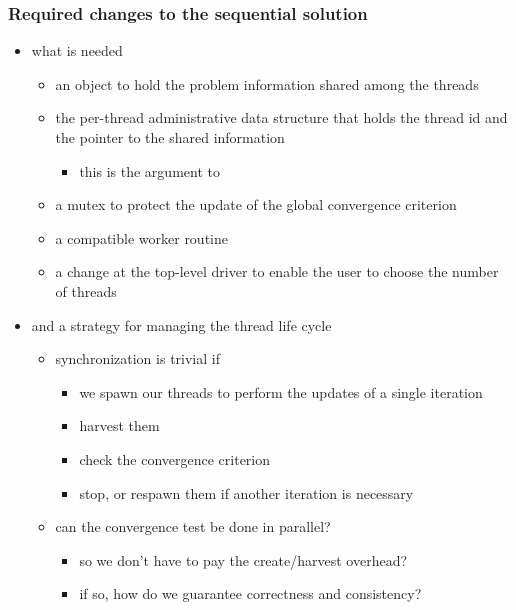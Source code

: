 \begin{frame}[fragile]
%
  \frametitle{Required changes to the sequential solution}
%
  \begin{itemize}
%
  \item what is needed
    \begin{itemize}
    \item an object to hold the problem information shared among the threads
    \item the per-thread administrative data structure that holds the thread id and the pointer
      to the shared information
      \begin{itemize}
      \item this is the argument to 
      \end{itemize}
    \item a mutex to protect the update of the global convergence criterion
    \item a  compatible worker routine
    \item a change at the top-level driver to enable the user to choose the number of threads
    \end{itemize}
%
  \item and a strategy for managing the thread life cycle
    \begin{itemize}
%
    \item synchronization is trivial if
      \begin{itemize}
      \item we spawn our threads to perform the updates of a single iteration
      \item harvest them
      \item check the convergence criterion 
      \item stop, or respawn them if another iteration is necessary
      \end{itemize}
%
    \item can the convergence test be done in parallel?
      \begin{itemize}
        \item so we don't have to pay the create/harvest overhead?
        \item if so, how do we guarantee correctness and consistency?
      \end{itemize}
%
    \end{itemize}
% 
  \end{itemize}
%
\end{frame}

